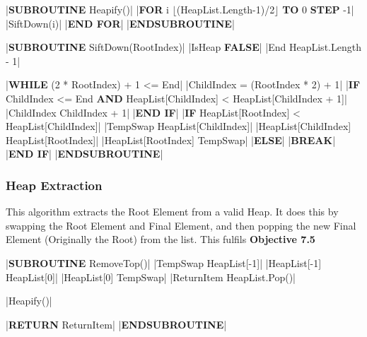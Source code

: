\begin{flushleft}
                \begin{pseudocode} 
|\textbf{SUBROUTINE} Heapify()|
    |\textbf{FOR} i \leftarrow $\lfloor$(HeapList.Length-1)/2$\rfloor$ \textbf{TO} 0 \textbf{STEP} -1|
        |SiftDown(i)|
    |\textbf{END FOR}|
|\textbf{ENDSUBROUTINE}| 

|\textbf{SUBROUTINE} SiftDown(RootIndex)|
    |IsHeap \leftarrow \textbf{FALSE}|
    |End \leftarrow HeapList.Length - 1|

    |\textbf{WHILE} (2 * RootIndex) + 1 <= End|
        |ChildIndex = (RootIndex * 2) + 1|
        |\textbf{IF} ChildIndex <= End \textbf{AND} HeapList[ChildIndex] < HeapList[ChildIndex + 1]|
            |ChildIndex \leftarrow ChildIndex + 1|
        |\textbf{END IF}|
        |\textbf{IF} HeapList[RootIndex] < HeapList[ChildIndex]|
            |TempSwap \leftarrow HeapList[ChildIndex]|
            |HeapList[ChildIndex] \leftarrow HeapList[RootIndex]|
            |HeapList[RootIndex] \leftarrow TempSwap|
        |\textbf{ELSE}|   
            |\textbf{BREAK}|
        |\textbf{END IF}|
|\textbf{ENDSUBROUTINE}| 
                \end{pseudocode}

                \vspace{0.5cm}
            \subsubsection{Heap Extraction}
                This algorithm extracts the Root Element from a valid Heap. It does this by swapping the Root Element and Final Element, and then
                popping the new Final Element (Originally the Root) from the list. This fulfils \textbf{Objective 7.5}
                \vspace{0.2cm}

                \begin{pseudocode}
|\textbf{SUBROUTINE} RemoveTop()|
    |TempSwap \leftarrow HeapList[-1]|
    |HeapList[-1] \leftarrow HeapList[0]|
    |HeapList[0] \leftarrow TempSwap|
    |ReturnItem \leftarrow HeapList.Pop()|

    |Heapify()|

    |\textbf{RETURN} ReturnItem|
|\textbf{ENDSUBROUTINE}| 
                \end{pseudocode}

                \vspace{0.5cm}

\end{flushleft}
